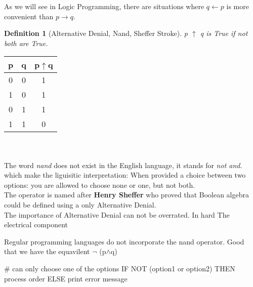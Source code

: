\documentclass[10pt,a4paper,draft,titlepage,onecolumn]{book}
\newtheorem{definition}{Definition}[section]
\begin{document}
As we will see in Logic Programming, there are situations where $q  \leftarrow p$  is more convenient than $ p \rightarrow q$.

\begin{definition}[Alternative Denial, Nand, Sheffer Stroke]
p $\uparrow$  q is True if not both are True.
\end{definition}

\begin{tabular}{ |c|c|c| }
 \hline
 p & q &  p$\uparrow$q  \\
 \hline
 0 & 0 & 1 \\
 1 & 0 & 1\\
 0 & 1 & 1\\
 1 & 1 & 0\\
 \hline
\end{tabular}  \\\\
The word \textit{nand} does not exist in the English language, it stands for \textit{not and}. which make the liguisitic interpretation: When provided a choice between two options: you are allowed to choose none or one, but not both.\\
The operator is named after \textbf{Henry Sheffer} who proved that Boolean algebra could be defined using a only Alternative Denial. \\

The importance of Alternative Denial can not be overrated. In hard The electrical component 



Regular programming languages do not incorporate the nand operator. Good that we have the equavilent $\neg$ (p$\wedge$q) 

\# can only choose one of the options
IF NOT (option1 or option2) THEN 
	process order\(\)
ELSE 
	print error message
\end{document}
